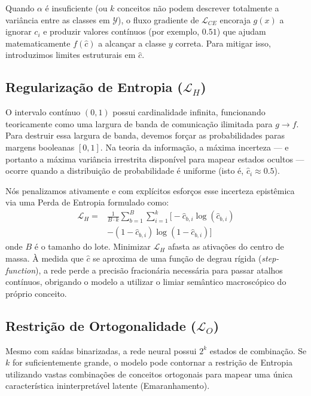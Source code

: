 \documentclass[times,twocolumn,final]{elsarticle}
\begin{document}
Quando $\alpha$ é insuficiente (ou $k$ conceitos não podem descrever totalmente a variância entre as classes em $\mathcal{Y}$), o fluxo gradiente de $\mathcal{L}_{CE}$ encoraja $g(x)$ a ignorar $c_i$ e produzir valores contínuos (por exemplo, $0.51$) que ajudam matematicamente $f(\hat{c})$ a alcançar a classe $y$ correta. Para mitigar isso, introduzimos limites estruturais em $\hat{c}$.

\subsection{Regularização de Entropia ($\mathcal{L}_{H}$)}
O intervalo contínuo $(0, 1)$ possui cardinalidade infinita, funcionando teoricamente como uma largura de banda de comunicação ilimitada para $g \rightarrow f$. Para destruir essa largura de banda, devemos forçar as probabilidades paras margens booleanas $[0, 1]$. Na teoria da informação, a máxima incerteza — e portanto a máxima variância irrestrita disponível para mapear estados ocultos — ocorre quando a distribuição de probabilidade é uniforme (isto é, $\hat{c}_i \approx 0.5$). 

Nós penalizamos ativamente e com explícitos esforços esse incerteza epistêmica via uma Perda de Entropia formulado como:
\begin{align}
    \mathcal{L}_{H} =&\frac{1}{B \cdot k} \sum_{b=1}^{B} \sum_{i=1}^{k} \Big[ - \hat{c}_{b,i} \log(\hat{c}_{b,i}) \nonumber \\
    &- (1 - \hat{c}_{b,i}) \log(1 - \hat{c}_{b,i}) \Big]
\end{align}
onde $B$ é o tamanho do lote. Minimizar $\mathcal{L}_{H}$ afasta as ativações do centro de massa. À medida que $\hat{c}$ se aproxima de uma função de degrau rígida (\textit{step-function}), a rede perde a precisão fracionária necessária para passar atalhos contínuos, obrigando o modelo a utilizar o limiar semântico macroscópico do próprio conceito.

\subsection{Restrição de Ortogonalidade ($\mathcal{L}_{O}$)}
Mesmo com saídas binarizadas, a rede neural possui $2^k$ estados de combinação. Se $k$ for suficientemente grande, o modelo pode contornar a restrição de Entropia utilizando vastas combinações de conceitos ortogonais para mapear uma única característica ininterpretável latente (Emaranhamento). 
\end{document}

